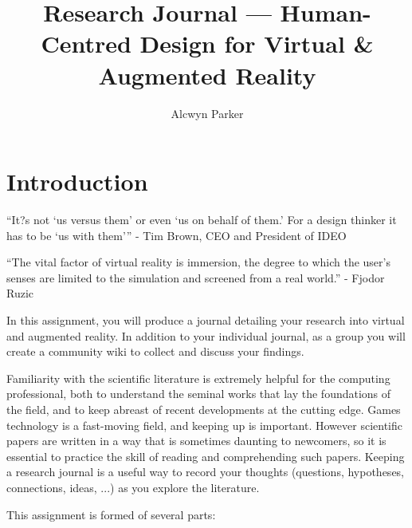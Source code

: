 \documentclass{../fal_assignment}
\title{Research Journal --- Human-Centred Design for Virtual \& Augmented Reality}
\author{Alcwyn Parker}
\begin{document}
\maketitle

\section*{Introduction}

\begin{marginquote}
``It?s not `us versus them' or even `us on behalf of them.' For a design thinker it has to be `us with them''' - Tim Brown, CEO and President of IDEO

  \marginquoterule
``The vital factor of virtual reality is immersion, the degree to which the user's senses are limited to the simulation and screened from a real world.'' - Fjodor Ruzic

\end{marginquote}

In this assignment, you will produce a journal detailing your research into virtual and augmented reality. In addition to your individual journal, as a group you will create a community wiki to collect and discuss your findings.

Familiarity with the scientific literature is extremely helpful for the computing professional,
both to understand the seminal works that lay the foundations of the field,
and to keep abreast of recent developments at the cutting edge.
Games technology is a fast-moving field, and keeping up is important.
However scientific papers are written in a way that is sometimes daunting to newcomers,
so it is essential to practice the skill of reading and comprehending such papers.
Keeping a research journal is a useful way to record your thoughts
(questions, hypotheses, connections, ideas, ...) as you explore the literature.

This assignment is formed of several parts:
\end{document}

